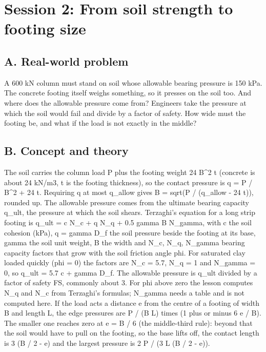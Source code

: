 \documentclass[11pt,a4paper]{article}
\begin{document}
\section{Session 2: From soil strength to footing size}

\subsection*{A. Real-world problem}
A 600 kN column must stand on soil whose allowable bearing pressure is 150 kPa. The concrete footing itself weighs something, so it presses on the soil too. And where does the allowable pressure come from? Engineers take the pressure at which the soil would fail and divide by a factor of safety. How wide must the footing be, and what if the load is not exactly in the middle?

\subsection*{B. Concept and theory}
The soil carries the column load P plus the footing weight 24 B\textasciicircum{}2 t (concrete is about 24 kN/m3, t is the footing thickness), so the contact pressure is q = P / B\textasciicircum{}2 + 24 t. Requiring q at most q\_allow gives B = sqrt(P / (q\_allow - 24 t)), rounded up. The allowable pressure comes from the ultimate bearing capacity q\_ult, the pressure at which the soil shears. Terzaghi's equation for a long strip footing is q\_ult = c N\_c + q N\_q + 0.5 gamma B N\_gamma, with c the soil cohesion (kPa), q = gamma D\_f the soil pressure beside the footing at its base, gamma the soil unit weight, B the width and N\_c, N\_q, N\_gamma bearing capacity factors that grow with the soil friction angle phi. For saturated clay loaded quickly (phi = 0) the factors are N\_c = 5.7, N\_q = 1 and N\_gamma = 0, so q\_ult = 5.7 c + gamma D\_f. The allowable pressure is q\_ult divided by a factor of safety FS, commonly about 3. For phi above zero the lesson computes N\_q and N\_c from Terzaghi's formulas; N\_gamma needs a table and is not computed here. If the load acts a distance e from the centre of a footing of width B and length L, the edge pressures are P / (B L) times (1 plus or minus 6 e / B). The smaller one reaches zero at e = B / 6 (the middle-third rule): beyond that the soil would have to pull on the footing, so the base lifts off, the contact length is 3 (B / 2 - e) and the largest pressure is 2 P / (3 L (B / 2 - e)).
\end{document}
